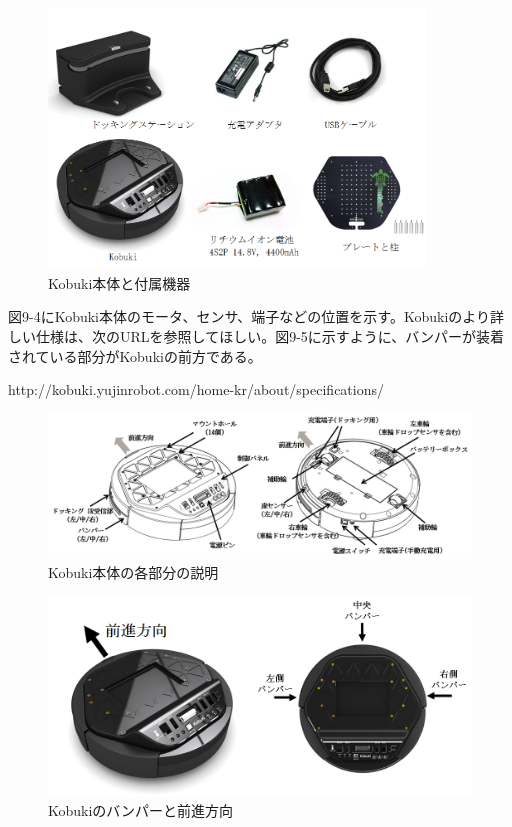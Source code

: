 \begin{figure}[htp]
  \centering
  \includegraphics[width=10cm]{pictures/chapter9/pic_09_03.png}
  \caption{Kobuki本体と付属機器}
\end{figure}


図9-4にKobuki本体のモータ、センサ、端子などの位置を示す。Kobukiのより詳しい仕様は、次のURLを参照してほしい。図9-5に示すように、バンパーが装着されている部分がKobukiの前方である。

http://kobuki.yujinrobot.com/home-kr/about/specifications/

\begin{figure}[htp]
  \centering
  \includegraphics[width=15cm]{pictures/chapter9/pic_09_04.png}
  \caption{Kobuki本体の各部分の説明}
\end{figure}


\begin{figure}[htp]
  \centering
  \includegraphics[width=12cm]{pictures/chapter9/pic_09_05.png}
  \caption{Kobukiのバンパーと前進方向}
\end{figure}

